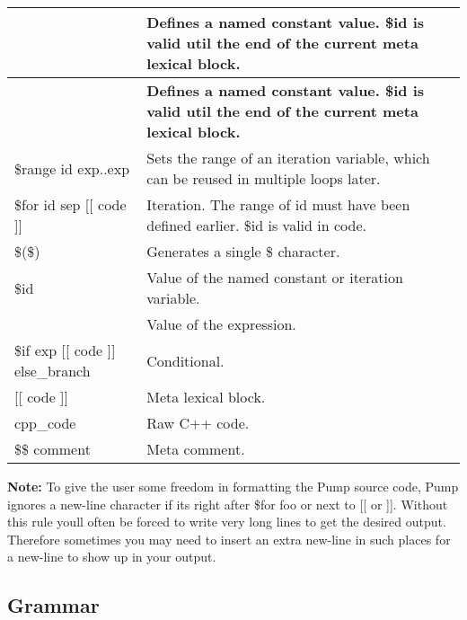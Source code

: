\tabulinesep=1mm
\begin{longtabu} spread 0pt [c]{*2{|X[-1]}|}
\hline
{}&{\bf Defines a named constant value. {\ttfamily \$id} is valid util the end of the current meta lexical block.  }\\
\endfirsthead
\hline
\endfoot
\hline
{}&{\bf Defines a named constant value. {\ttfamily \$id} is valid util the end of the current meta lexical block.  }\\
\endhead
{\ttfamily \$range id exp..exp} &Sets the range of an iteration variable, which can be reused in multiple loops later. \\
{\ttfamily \$for id sep \mbox{[}\mbox{[} code \mbox{]}\mbox{]}} &Iteration. The range of {\ttfamily id} must have been defined earlier. {\ttfamily \$id} is valid in {\ttfamily code}. \\
{\ttfamily \$(\$)} &Generates a single {\ttfamily \$} character. \\
{\ttfamily \$id} &Value of the named constant or iteration variable. \\
{\ttfamily } &Value of the expression. \\
{\ttfamily \$if exp \mbox{[}\mbox{[} code \mbox{]}\mbox{]} else\+\_\+branch} &Conditional. \\
{\ttfamily \mbox{[}\mbox{[} code \mbox{]}\mbox{]}} &Meta lexical block. \\
{\ttfamily cpp\+\_\+code} &Raw C++ code. \\
{\ttfamily \$\$ comment} &Meta comment. \\
\end{longtabu}
{\bfseries Note\+:} To give the user some freedom in formatting the Pump source code, Pump ignores a new-\/line character if it\textquotesingle{}s right after {\ttfamily \$for foo} or next to {\ttfamily \mbox{[}\mbox{[}} or {\ttfamily \mbox{]}\mbox{]}}. Without this rule you\textquotesingle{}ll often be forced to write very long lines to get the desired output. Therefore sometimes you may need to insert an extra new-\/line in such places for a new-\/line to show up in your output.

\subsection*{Grammar}



